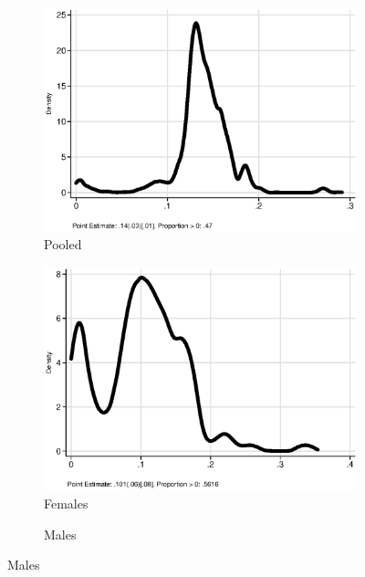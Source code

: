 \begin{figure}
\centering
\caption{Internal Rate of Return by Gender}\label{figure:irrdist}
\begin{subfigure}[h]{0.35\textwidth}
		\centering
		\caption{Pooled}
		\includegraphics[width=\textwidth]{output/irr_2_sexp.eps}
\end{subfigure}%
\begin{subfigure}[h]{0.35\textwidth}
	\centering
	\caption{Females}
		\includegraphics[width=\textwidth]{output/irr_2_sexf.eps}
\end{subfigure}%
\begin{subfigure}[h]{0.35\textwidth}
		\centering
		\caption{Males}

\end{subfigure}
\end{figure}
